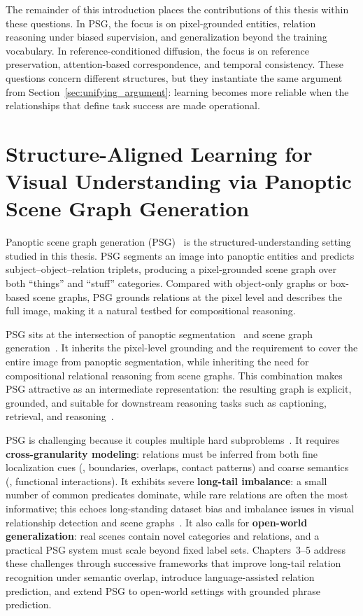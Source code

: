 The remainder of this introduction places the contributions of this thesis within these questions. In PSG, the focus is on pixel-grounded entities, relation reasoning under biased supervision, and generalization beyond the training vocabulary. In reference-conditioned diffusion, the focus is on reference preservation, attention-based correspondence, and temporal consistency. These questions concern different structures, but they instantiate the same argument from Section~\ref{sec:unifying_argument}: learning becomes more reliable when the relationships that define task success are made operational.

\section[Structure-Aligned Learning for Visual Understanding]{Structure-Aligned Learning for Visual Understanding via Panoptic Scene Graph Generation}
Panoptic scene graph generation (PSG)~\citep{yang2022panoptic} is the structured-understanding setting studied in this thesis. PSG segments an image into panoptic entities and predicts subject--object--relation triplets, producing a pixel-grounded scene graph over both ``things'' and ``stuff'' categories. Compared with object-only graphs or box-based scene graphs, PSG grounds relations at the pixel level and describes the full image, making it a natural testbed for compositional reasoning.

PSG sits at the intersection of panoptic segmentation~\citep{kirillov2019panoptic} and scene graph generation~\citep{lu2016visual}. It inherits the pixel-level grounding and the requirement to cover the entire image from panoptic segmentation, while inheriting the need for compositional relational reasoning from scene graphs. This combination makes PSG attractive as an intermediate representation: the resulting graph is explicit, grounded, and suitable for downstream reasoning tasks such as captioning, retrieval, and reasoning~\citep{hildebrandt2020scene, chen2020say, shi2019explainable}.

PSG is challenging because it couples multiple hard subproblems~\citep{yang2022panoptic}. It requires \textbf{cross-granularity modeling}: relations must be inferred from both fine localization cues (\eg, boundaries, overlaps, contact patterns) and coarse semantics (\eg, functional interactions). It exhibits severe \textbf{long-tail imbalance}: a small number of common predicates dominate, while rare relations are often the most informative; this echoes long-standing dataset bias and imbalance issues in visual relationship detection and scene graphs~\citep{zellers2018neural, cheng2022visual}. It also calls for \textbf{open-world generalization}: real scenes contain novel categories and relations, and a practical PSG system must scale beyond fixed label sets. Chapters~3--5 address these challenges through successive frameworks that improve long-tail relation recognition under semantic overlap, introduce language-assisted relation prediction, and extend PSG to open-world settings with grounded phrase prediction.

